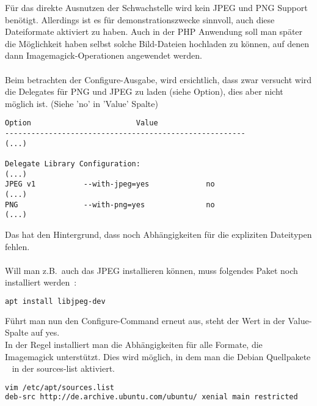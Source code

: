 Für das direkte Ausnutzen der Schwachstelle wird kein JPEG und PNG Support benötigt.
Allerdings ist es für demonstrationszwecke sinnvoll, auch diese Dateiformate aktiviert zu haben.
Auch in der PHP Anwendung soll man später die Möglichkeit haben selbst solche Bild-Dateien hochladen zu können,
auf denen dann Imagemagick-Operationen angewendet werden.\\\\

Beim betrachten der Configure-Ausgabe, wird ersichtlich,
dass zwar versucht wird die Delegates für PNG und JPEG zu laden (siehe Option),
dies aber nicht möglich ist. (Siehe 'no' in 'Value' Spalte)

\begin{lstlisting}[language=Text, caption=Imagemagick Installation: Auszug aus Configure-Output,label={lst:installconfigureoutput}]
Option                        Value
-------------------------------------------------------
(...)

Delegate Library Configuration:
(...)
JPEG v1           --with-jpeg=yes             no
(...)
PNG               --with-png=yes              no
(...)
\end{lstlisting}
\vspace{5mm}

Das hat den Hintergrund, dass noch Abhängigkeiten für die expliziten Dateitypen fehlen.\\\\

Will man z.B.\ auch das JPEG installieren können, muss folgendes Paket noch installiert werden~\cite{ImageMagickPNGDelegate}:

\begin{lstlisting}[language=Bash, caption=Imagemagick Installation: Delegate Dependencies,label={lst:installdelegatedep}]
apt install libjpeg-dev
\end{lstlisting}
\vspace{5mm}

Führt man nun den Configure-Command erneut aus, steht der Wert in der Value-Spalte auf yes.\\

In der Regel installiert man die Abhängigkeiten für alle Formate, die Imagemagick unterstützt.
Dies wird möglich, in dem man die Debian Quellpakete
~\cite{DateiEtcApt} in der sources-list aktiviert.~\cite{HowInstallImageMagick}\\


\begin{lstlisting}[language=Bash, caption=Imagemagick Installation: Sources List,label={lst:installsourcelist}]
vim /etc/apt/sources.list
deb-src http://de.archive.ubuntu.com/ubuntu/ xenial main restricted
\end{lstlisting}
\vspace{5mm}

